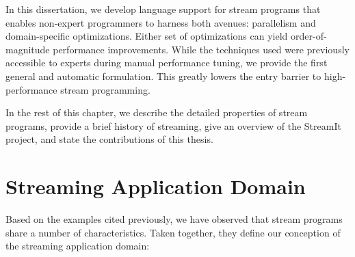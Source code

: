 

In this dissertation, we develop language support for stream programs
that enables non-expert programmers to harness both avenues:
parallelism and domain-specific optimizations.  Either set of
optimizations can yield order-of-magnitude performance improvements.
While the techniques used were previously accessible to experts during
manual performance tuning, we provide the first general and automatic
formulation.  This greatly lowers the entry barrier to
high-performance stream programming.


In the rest of this chapter, we describe the detailed properties of
stream programs, provide a brief history of streaming, give an
overview of the StreamIt project, and state the contributions of this
thesis.

\section{Streaming Application Domain}

Based on the examples cited previously, we have observed that stream
programs share a number of characteristics.  Taken together, they
define our conception of the streaming application domain:

